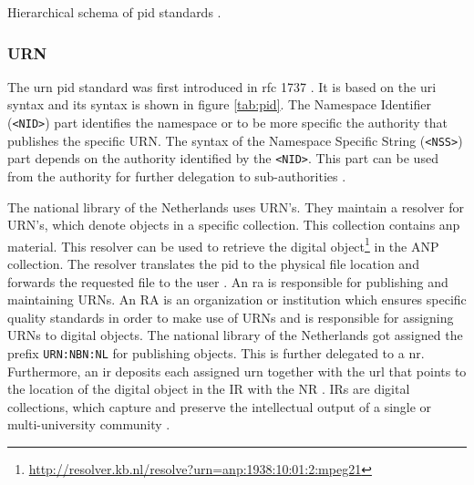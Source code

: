 \begin {table}[H]
\caption {Hierarchical schema of \gls{pid} standards \cite{icn-bd}.} \label{tab:pid} 
\begin{center}
\end{center}
\end {table}


\subsubsection{URN}\label{urn-1}
The \gls{urn} \gls{pid} standard was first introduced in \gls{rfc} 1737 \cite{rfc1737}. It is based on the \gls{uri} syntax and its syntax is shown in figure \ref{tab:pid}. The Namespace Identifier (\texttt{\textless NID\textgreater}) part identifies the namespace or to be more specific the authority that publishes the specific URN.
The syntax of the Namespace Specific String (\texttt{\textless NSS\textgreater}) part depends on the authority identified by the \texttt{\textless NID\textgreater}. This part can be used from the authority for further delegation to sub-authorities \cite{icn-bd}.

The national library of the Netherlands uses URN's. They maintain a resolver for URN's, which denote objects in a specific collection. This collection contains \gls{anp} material.
This resolver can be used to retrieve the digital object\footnote{\url{http://resolver.kb.nl/resolve?urn=anp:1938:10:01:2:mpeg21}} in the ANP collection. The resolver translates the \gls{pid} to the physical file location and forwards the requested file to the user \cite{kb-metadata}. 
An \gls{ra} is responsible for publishing and maintaining URNs. An RA is an organization or institution which ensures specific quality standards in order to make use of URNs and is responsible for assigning URNs to digital objects. The national library of the Netherlands got assigned the prefix \texttt{URN:NBN:NL} for publishing objects. This is further delegated to a \gls{nr}. Furthermore, an \gls{ir} deposits each assigned \gls{urn} together with the \gls{url} that points to the location of the digital object in the IR with the NR \cite{kb-ir}. IRs are digital collections, which capture and preserve the intellectual output of a single or multi-university community \cite{cwi-ir}.


